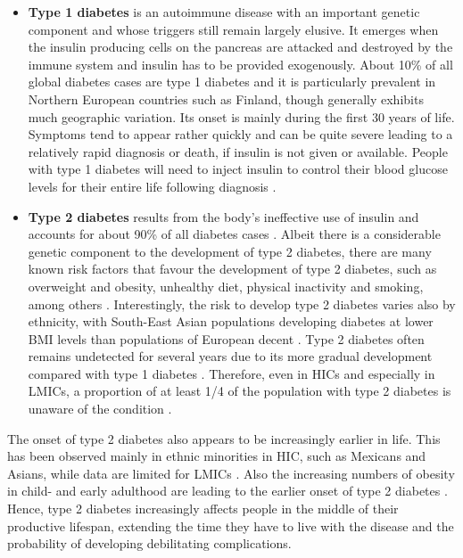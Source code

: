 \begin{itemize}
\item \textbf{Type 1 diabetes} is an autoimmune disease with an important genetic component and whose triggers still remain largely elusive. It emerges when the insulin producing cells on the pancreas are attacked and destroyed by the immune system and insulin has to be provided exogenously. About 10\% of all global diabetes cases are type 1 diabetes and it is particularly prevalent in Northern European countries such as Finland, though generally exhibits much geographic variation. Its onset is mainly during the first 30 years of life. Symptoms tend to appear rather quickly and can be quite severe leading to a relatively rapid diagnosis or death, if insulin is not given or available. People with type 1 diabetes will need to inject insulin to control their blood glucose levels for their entire life following diagnosis \parencite{Tuomilehto2013}. 
\item \textbf{Type 2 diabetes} results from the body's ineffective use of insulin and accounts for about 90\% of all diabetes cases \parencite{WorldHealthOrganization2016}. Albeit there is a considerable genetic component to the development of type 2 diabetes, there are many known risk factors that favour the development of type 2 diabetes, such as overweight and obesity, unhealthy diet, physical inactivity and smoking, among others \parencite{WorldHealthOrganization2016, AmericanDiabetesAssociation2014}. Interestingly, the risk to develop type 2 diabetes varies also by ethnicity, with South-East Asian populations developing diabetes at lower \ac{BMI} levels than populations of European decent \parencite{Ramachandran2010}. Type 2 diabetes often remains undetected for several years due to its more gradual development compared with type 1 diabetes \parencite{AmericanDiabetesAssociation2014}. Therefore, even in \acp{HIC} and especially in \acp{LMIC}, a proportion of at least 1/4 of the population with type 2 diabetes is unaware of the condition \parencite{Beagley2014}. 
\end{itemize}

The onset of type 2 diabetes also appears to be increasingly earlier in life. This has been observed mainly in ethnic minorities in \acs{HIC}, such as Mexicans and Asians, while data are limited for \acp{LMIC} \parencite{FazeliFarsani2013}. Also the increasing numbers of obesity in child- and early adulthood are leading to the earlier onset of type 2 diabetes \parencite{Chen2012}. Hence, type 2 diabetes increasingly affects people in the middle of their productive lifespan, extending the time they have to live with the disease and the probability of developing debilitating complications.

